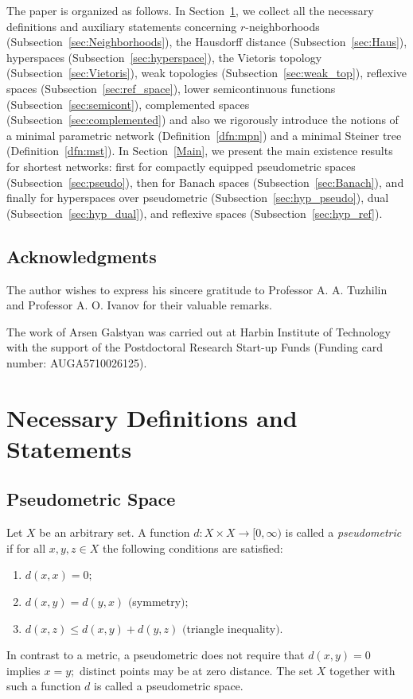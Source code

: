 \documentclass{svproc}
\begin{document}
The paper is organized as follows. In Section~\ref{Definitions}, we collect all the necessary definitions and auxiliary statements concerning $r$-neighborhoods (Subsection~\ref{sec:Neighborhoods}), the Hausdorff distance (Subsection~\ref{sec:Haus}), hyperspaces (Subsection~\ref{sec:hyperspace}), the Vietoris topology (Subsection~\ref{sec:Vietoris}), weak topologies (Subsection~\ref{sec:weak_top}), reflexive spaces (Subsection~\ref{sec:ref_space}), lower semicontinuous functions (Subsection~\ref{sec:semicont}), complemented spaces (Subsection~\ref{sec:complemented}) and also we rigorously introduce the notions of a minimal parametric network (Definition~\ref{dfn:mpn}) and a minimal Steiner tree (Definition~\ref{dfn:mst}). In Section~\ref{Main}, we present the main existence results for shortest networks: first for compactly equipped pseudometric spaces (Subsection~\ref{sec:pseudo}), then for Banach spaces (Subsection~\ref{sec:Banach}), and finally for hyperspaces over pseudometric (Subsection~\ref{sec:hyp_pseudo}), dual (Subsection~\ref{sec:hyp_dual}), and reflexive spaces (Subsection~\ref{sec:hyp_ref}).

%
\subsection*{Acknowledgments}
%

The author wishes to express his sincere gratitude to Professor A. A. Tuzhilin and Professor A. O. Ivanov for their valuable remarks.

The work of Arsen Galstyan was carried out at Harbin Institute of Technology with the support of the Postdoctoral Research Start-up Funds (Funding card number: AUGA5710026125).


%
\section{Necessary Definitions and Statements}\label{Definitions}
%

\subsection{Pseudometric Space}

\begin{definition}
Let $X$ be an arbitrary set. A function $d\colon X\times X\to [0,\infty)$ is called a \textit{pseudometric} if for all $x,y,z\in X$ the following conditions are satisfied$:$
\begin{enumerate}
\item[$(1)$] $d(x,x)=0;$
\item[$(2)$] $d(x,y)=d(y,x)$ $($symmetry$);$
\item[$(3)$] $d(x,z)\le d(x,y)+d(y,z)$ $($triangle inequality$).$
\end{enumerate}
In contrast to a metric, a pseudometric does not require that $d(x,y)=0$ implies $x=y;$ distinct points may be at zero distance.
The set $X$ together with such a function $d$ is called a pseudometric space.
\end{definition}
\end{document}
